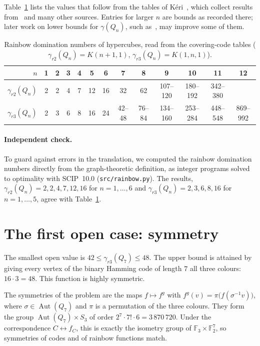 \documentclass[11pt]{article}
\theoremstyle{definition}
\theoremstyle{remark}
\newcommand{\F}{\mathbb{F}}
\begin{document}
Table~\ref{tab:values} lists the values that follow from the tables of K\'eri~\cite{keri},
which collect results from~\cite{bow,oh,ob,lqs} and many other sources. Entries for larger $n$
are bounds as recorded there; later work on lower bounds for $\gamma(Q_n)$, such
as~\cite{wu-chen,gp}, may improve some of them.

\begin{table}[h]
\centering
\begin{tabular}{rcccccccccccc}
\toprule
$n$ & 1 & 2 & 3 & 4 & 5 & 6 & 7 & 8 & 9 & 10 & 11 & 12\\
\midrule
$\gamma_{r2}(Q_n)$ & 2 & 2 & 4 & 7 & 12 & 16 & 32 & 62 & 107--120 & 180--192 & 342--380 & \\
$\gamma_{r3}(Q_n)$ & 2 & 3 & 6 & 8 & 16 & 24 & 42--48 & 76--84 & 134--160 & 253--284 & 448--548 & 869--992\\
\bottomrule
\end{tabular}
\caption{Rainbow domination numbers of hypercubes, read from the covering-code tables
($\gamma_{r2}(Q_n)=K(n+1,1)$, $\gamma_{r3}(Q_n)=K(1,n,1)$).}\label{tab:values}
\end{table}

\paragraph{Independent check.} To guard against errors in the translation, we computed the rainbow
domination numbers directly from the graph-theoretic definition, as integer programs solved to
optimality with SCIP~10.0 (\texttt{src/rainbow.py}). The results,
$\gamma_{r2}(Q_n)=2,2,4,7,12,16$ for $n=1,\dots,6$ and $\gamma_{r3}(Q_n)=2,3,6,8,16$ for
$n=1,\dots,5$, agree with Table~\ref{tab:values}.

\section{The first open case: symmetry}\label{sec:sym}

The smallest open value is $42\le\gamma_{r3}(Q_7)\le 48$. The upper bound is attained by giving
every vertex of the binary Hamming code of length $7$ all three colours: $16\cdot 3=48$. This
function is highly symmetric.

The symmetries of the problem are the maps $f\mapsto f^{g}$ with
$f^{g}(v)=\pi\bigl(f(\sigma^{-1}v)\bigr)$, where $\sigma\in\operatorname{Aut}(Q_7)$ and $\pi$ is a
permutation of the three colours. They form the group $\operatorname{Aut}(Q_7)\times S_3$ of
order $2^7\cdot 7!\cdot 6=3\,870\,720$. Under the correspondence $C\leftrightarrow f_C$, this is
exactly the isometry group of $\F_3\times\F_2^7$, so symmetries of codes and of rainbow functions
match.
\end{document}
